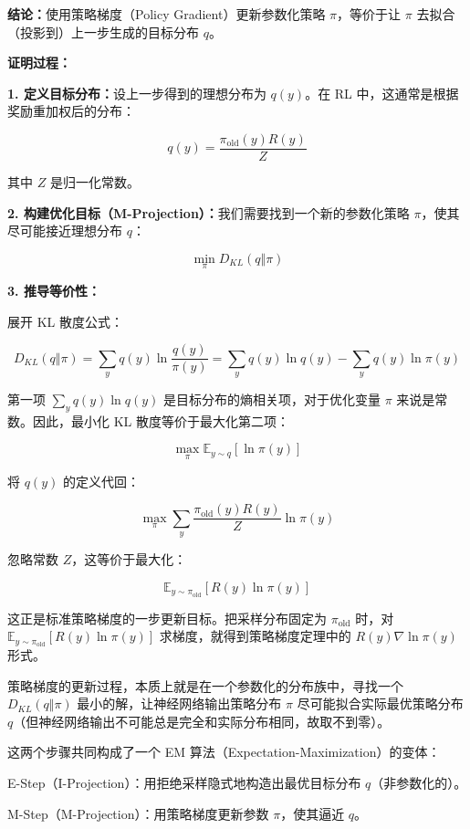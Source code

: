 \textbf{结论：}使用策略梯度（Policy Gradient）更新参数化策略 \(\pi\)，等价于让 \(\pi\) 去拟合（投影到）上一步生成的目标分布 \(q\)。

\textbf{证明过程：}

\textbf{1. 定义目标分布：}设上一步得到的理想分布为 \(q(y)\)。在 RL 中，这通常是根据奖励重加权后的分布：

\[
q(y)=\frac{\pi_{\mathrm{old}}(y)R(y)}{Z}
\]

其中 \(Z\) 是归一化常数。

\textbf{2. 构建优化目标（M-Projection）：}我们需要找到一个新的参数化策略 \(\pi\)，使其尽可能接近理想分布 \(q\)：

\[
\min_\pi D_{KL}(q\Vert \pi)
\]

\textbf{3. 推导等价性：}

展开 KL 散度公式：

\[
D_{KL}(q\Vert \pi)
= \sum_y q(y)\ln\frac{q(y)}{\pi(y)}
= \sum_y q(y)\ln q(y)-\sum_y q(y)\ln\pi(y)
\]

第一项 \(\sum_y q(y)\ln q(y)\) 是目标分布的熵相关项，对于优化变量 \(\pi\) 来说是常数。因此，最小化 KL 散度等价于最大化第二项：

\[
\max_\pi \mathbb{E}_{y\sim q}[\ln \pi(y)]
\]

将 \(q(y)\) 的定义代回：

\[
\max_\pi \sum_y \frac{\pi_{\mathrm{old}}(y)R(y)}{Z}\ln\pi(y)
\]

忽略常数 \(Z\)，这等价于最大化：

\[
\mathbb{E}_{y\sim \pi_{\mathrm{old}}}[R(y)\ln\pi(y)]
\]

这正是标准策略梯度的一步更新目标。把采样分布固定为 \(\pi_{\mathrm{old}}\) 时，对 \(\mathbb{E}_{y\sim\pi_{\mathrm{old}}}[R(y)\ln\pi(y)]\) 求梯度，就得到策略梯度定理中的 \(R(y)\nabla\ln\pi(y)\) 形式。

策略梯度的更新过程，本质上就是在一个参数化的分布族中，寻找一个 \(D_{KL}(q\Vert \pi)\) 最小的解，让神经网络输出策略分布 \(\pi\) 尽可能拟合实际最优策略分布 \(q\)（但神经网络输出不可能总是完全和实际分布相同，故取不到零）。

这两个步骤共同构成了一个 EM 算法（Expectation-Maximization）的变体：

E-Step（I-Projection）：用拒绝采样隐式地构造出最优目标分布 \(q\)（非参数化的）。

M-Step（M-Projection）：用策略梯度更新参数 \(\pi\)，使其逼近 \(q\)。

